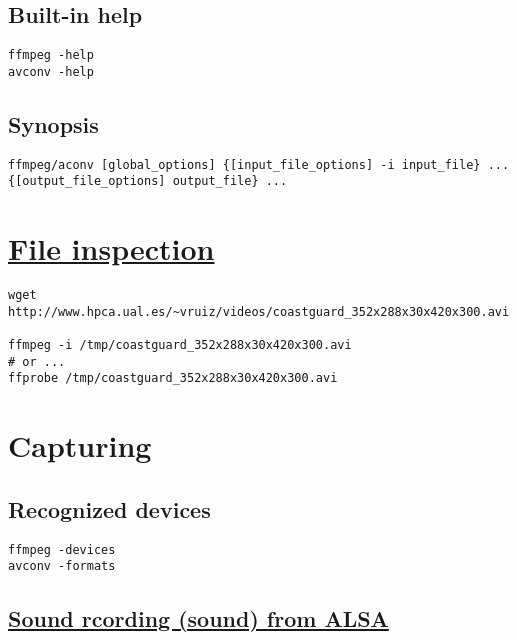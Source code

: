 
\section{Built-in help}

\begin{verbatim}
ffmpeg -help
avconv -help
\end{verbatim}


\section{Synopsis}

\begin{verbatim}
ffmpeg/aconv [global_options] {[input_file_options] -i input_file} ... {[output_file_options] output_file} ... 
\end{verbatim}



\chapter{\href{http://www.ffmpeg.org/ffprobe.html}{File inspection}}

\begin{verbatim}
wget http://www.hpca.ual.es/~vruiz/videos/coastguard_352x288x30x420x300.avi

ffmpeg -i /tmp/coastguard_352x288x30x420x300.avi
# or ...
ffprobe /tmp/coastguard_352x288x30x420x300.avi
\end{verbatim}


\chapter{Capturing}

\section{Recognized devices}

\begin{verbatim}
ffmpeg -devices
avconv -formats
\end{verbatim}


\section{\href{https://trac.ffmpeg.org/wiki/Capture/ALSA}{Sound rcording (sound) from ALSA}}


